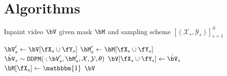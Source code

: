 \chapter{Algorithms}

\begin{algorithm}[h]
\caption{Inpaint video $\bV$ given mask $\bM$ and sampling scheme $\left[(\mathcal{X}_s, \mathcal{Y}_s)\right]^S_{s=1}$}
\label{alg:alg}
\begin{algorithmic}[1]
\State $\bV_s' \gets \bV [\fX_s \cup \fY_s]$
\State $\bM_s' \gets \bM [\fX_s \cup \fY_s]$
\State $\hat{\bV}_s \sim \texttt{DDPM}(\cdot;\bV_s', \bM_s', \mathcal{X}, \mathcal{Y},\theta)$
\State $\bV [\fX_s \cup \fY_s] \gets \hat{\bV}_s$
\State $\bM [\fX_s] \gets \mathbbm{1}$
\EndFor
\State \Return $\bV$
\end{algorithmic}
\end{algorithm}